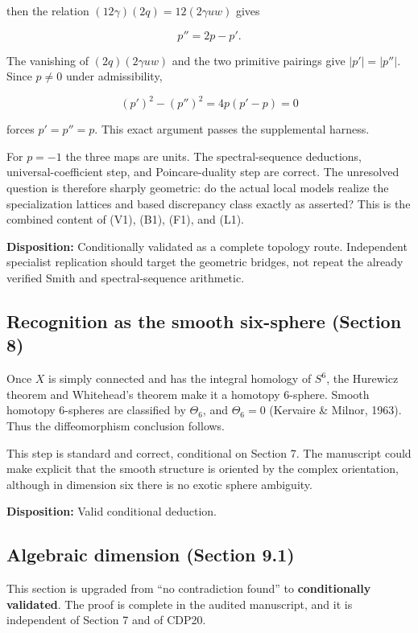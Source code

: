 \documentclass[
  10pt,
  letterpaper,
]{article}
\begin{document}
then the relation \((12\gamma)(2q)=12(2\gamma uw)\) gives

\[
p''=2p-p'.
\]

The vanishing of \((2q)(2\gamma uw)\) and the two primitive pairings
give \(|p'|=|p''|\). Since \(p\ne0\) under admissibility,

\[
(p')^2-(p'')^2=4p(p'-p)=0
\]

forces \(p'=p''=p\). This exact argument passes the supplemental
harness.

For \(p=-1\) the three maps are units. The spectral-sequence deductions,
universal-coefficient step, and Poincare-duality step are correct. The
unresolved question is therefore sharply geometric: do the actual local
models realize the specialization lattices and based discrepancy class
exactly as asserted? This is the combined content of (V1), (B1), (F1),
and (L1).

\textbf{Disposition:} Conditionally validated as a complete topology
route. Independent specialist replication should target the geometric
bridges, not repeat the already verified Smith and spectral-sequence
arithmetic.

\subsection{Recognition as the smooth six-sphere (Section
8)}\label{recognition-as-the-smooth-six-sphere-section-8}

Once \(X\) is simply connected and has the integral homology of \(S^6\),
the Hurewicz theorem and Whitehead's theorem make it a homotopy
\(6\)-sphere. Smooth homotopy \(6\)-spheres are classified by
\(\Theta_6\), and \(\Theta_6=0\) (Kervaire \& Milnor, 1963). Thus the
diffeomorphism conclusion follows.

This step is standard and correct, conditional on Section 7. The
manuscript could make explicit that the smooth structure is oriented by
the complex orientation, although in dimension six there is no exotic
sphere ambiguity.

\textbf{Disposition:} Valid conditional deduction.

\subsection{Algebraic dimension (Section
9.1)}\label{algebraic-dimension-section-9.1}

This section is upgraded from ``no contradiction found'' to
\textbf{conditionally validated}. The proof is complete in the audited
manuscript, and it is independent of Section 7 and of CDP20.
\end{document}
